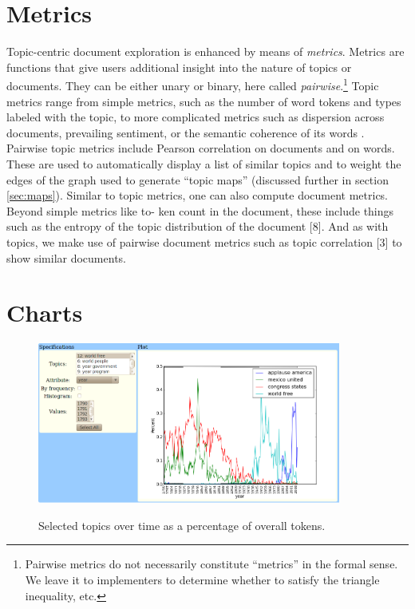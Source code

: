 \documentclass[11pt]{article}
\begin{document}
\section{Metrics}
Topic-centric document exploration is enhanced by means of \textit{metrics}.
Metrics are functions that give users additional insight into the nature of
topics or documents. They can be either unary or binary, here called
\textit{pairwise}.\footnote{Pairwise metrics do not necessarily constitute
``metrics'' in the formal sense. We leave it to implementers to determine
whether to satisfy the triangle inequality, etc.} Topic metrics range from
simple metrics, such as the number of word tokens and types labeled with the
topic, to more complicated metrics such as dispersion across documents,
prevailing sentiment, or the semantic coherence of its words \cite{Newman2010}.
Pairwise topic metrics include Pearson correlation on documents and on words.
These are used to automatically display a list of similar topics and to weight
the edges of the graph used to generate ``topic maps'' (discussed further in section
\ref{sec:maps}). Similar to topic metrics, one can also compute document
metrics. Beyond simple metrics like to- ken count in the document, these include
things such as the entropy of the topic distribution of the document [8]. And as
with topics, we make use of pairwise document metrics such as topic%
correlation [3] to show similar documents.%

\section{Charts}

\begin{figure}[t]
 \centering
 \includegraphics[height=200px,keepaspectratio=true]{./topics_vs_years.png}
 \label{fig:chart}
 \caption{Selected topics over time as a percentage of overall tokens.}
\end{figure}
\end{document}
